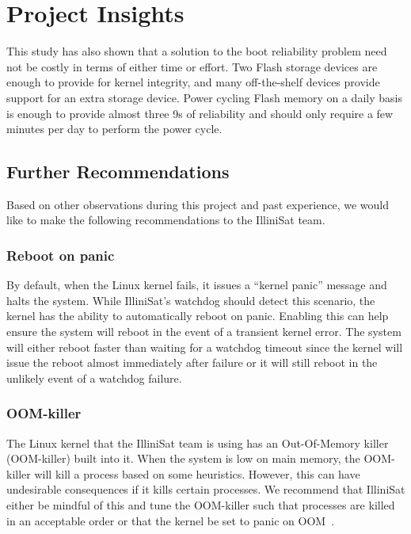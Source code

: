 \section{Project Insights}\label{sec:insights}

This study has also shown that a solution to the boot reliability problem need not be costly in terms of either time or effort.  Two Flash storage devices are enough to provide for kernel integrity, and many off-the-shelf devices provide support for an extra storage device.  Power cycling Flash memory on a daily basis is enough to provide almost three 9s of reliability and should only require a few minutes per day to perform the power cycle.

\subsection{Further Recommendations}
Based on other observations during this project and past experience, we would
like to make the following recommendations to the IlliniSat team.

\subsubsection{Reboot on panic} By default, when the Linux kernel fails, it
issues a ``kernel panic'' message and halts the system.  While IlliniSat's
watchdog should detect this scenario, the kernel has the ability to
automatically reboot on panic.  Enabling this can help ensure the system will
reboot in the event of a transient kernel error. The system will either reboot
faster than waiting for a watchdog timeout since the kernel will issue the
reboot almost immediately after failure or it will still reboot in the unlikely
event of a watchdog failure.

\subsubsection{OOM-killer} The Linux kernel that the IlliniSat team is using
has an Out-Of-Memory killer (OOM-killer) built into it. When the system is 
low on main memory, the OOM-killer will kill a process based on some heuristics.
However, this can have undesirable consequences if it kills certain processes.
We recommend that IlliniSat either be mindful of this and tune the OOM-killer
such that processes are killed in an acceptable order or that the kernel be set
to panic on OOM~\cite{oracle_oom}.

